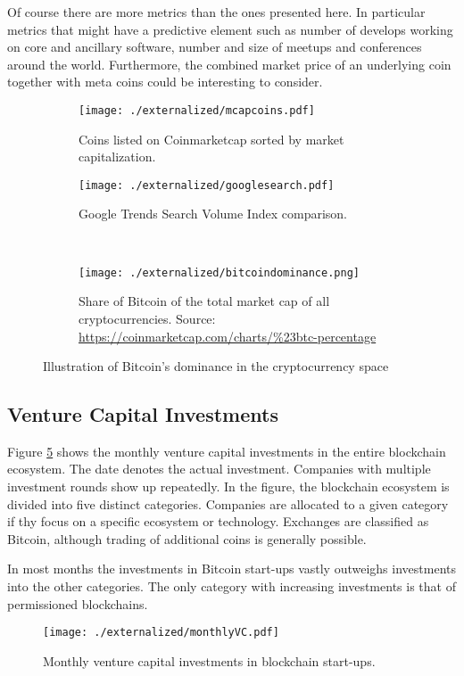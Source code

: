 Of course there are more metrics than the ones presented here. In particular metrics that might have a predictive element such as number of develops working on core and ancillary software, number and size of meetups and conferences around the world. Furthermore, the combined market price of an underlying coin together with meta coins could be interesting to consider. 


\begin{figure}[ht]
  \centering
  \begin{subfigure}[t]{0.45\linewidth}
    \centering
	\texttt{[image: ./externalized/mcapcoins.pdf]}
	\caption{Coins listed on Coinmarketcap sorted by market capitalization.}
	\label{fig:eco:mcap}
  \end{subfigure}
  \begin{subfigure}[t]{0.45\linewidth}
  	\centering
	\texttt{[image: ./externalized/googlesearch.pdf]}
	\caption{Google Trends Search Volume Index comparison.}
	\label{fig:eco:googlesearch}
  \end{subfigure}%
  \\
  \begin{subfigure}[t]{0.95\linewidth}
  	\centering
	\texttt{[image: ./externalized/bitcoindominance.png]}
	\caption{Share of Bitcoin of the total market cap of all cryptocurrencies. Source: 
	\url{https://coinmarketcap.com/charts/\%23btc-percentage}}
	\label{fig:eco:bitcoindominance}
  \end{subfigure}%
  \caption{Illustration of Bitcoin's dominance in the cryptocurrency space}
\end{figure}


\subsection{Venture Capital Investments}

Figure \ref{fig:eco:vcfund} shows the monthly venture capital investments in the entire blockchain ecosystem. The date denotes the actual investment. Companies with multiple investment rounds show up repeatedly. In the figure, the blockchain ecosystem is divided into five distinct categories. Companies are allocated to a given category if thy focus on a specific ecosystem or technology. Exchanges are classified as Bitcoin, although trading of additional coins is generally possible. 

In most months the investments in Bitcoin start-ups vastly outweighs investments into the other categories. The only category with increasing investments is that of permissioned blockchains.
\begin{figure}[ht]
\centering
\texttt{[image: ./externalized/monthlyVC.pdf]}
\caption{Monthly venture capital investments in blockchain start-ups.}
\label{fig:eco:vcfund}
\end{figure}

